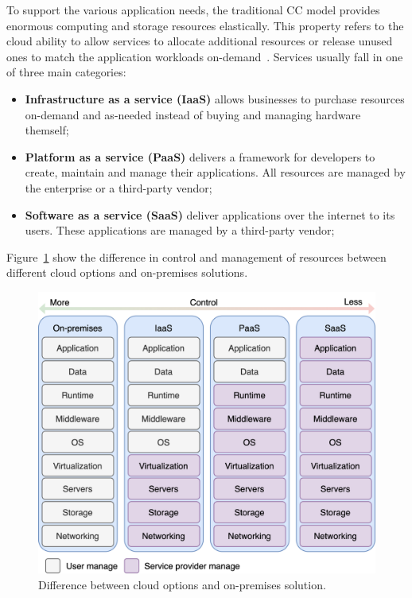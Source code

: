 To support the various application needs, the traditional CC model provides enormous computing and storage resources elastically. This property refers to the cloud ability to allow services to allocate additional resources or release unused ones to match the application workloads on-demand~\cite{AssuncaoVB18}. Services usually fall in one of three main categories: 

\begin{itemize}
	\item \textbf{Infrastructure as a service (IaaS)} allows businesses to purchase resources on-demand and as-needed instead of buying and managing hardware themself;
	\item \textbf{Platform as a service (PaaS)} delivers a framework for developers to create, maintain and manage their applications. All resources are managed by the enterprise or a third-party vendor;
	\item \textbf{Software as a service (SaaS)} deliver applications over the internet to its users. These applications are managed by a third-party vendor;
\end{itemize}

Figure~\ref{fig:fig1} show the difference in control and management of resources between different cloud options and on-premises solutions.

\begin{figure}[H]
	\begin{center}
		\includegraphics[scale=0.9]{images/Figure1.png}
	\end{center}
	\vspace{-0.6cm}
	\caption{Difference between cloud options and on-premises solution.}
	\label{fig:fig1}
\end{figure}


